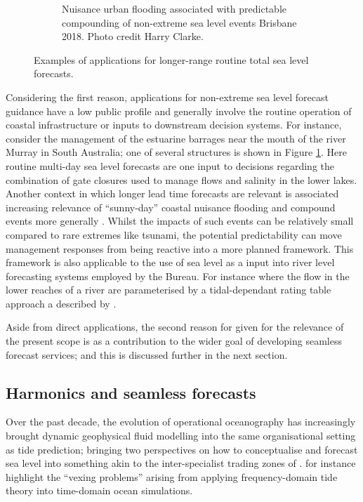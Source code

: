 \begin{figure}[!hbt]
\begin{subfigure}[t]{\figwidthHalf}
      \caption{Nuisance urban flooding associated with predictable compounding of non-extreme sea level events Brisbane 2018. Photo credit Harry Clarke.}
  \end{subfigure}
  \caption{Examples of applications for longer-range routine total sea level forecasts.} 
  \label{fig:applicationPhotos}
\end{figure}


Considering the first reason, applications for non-extreme sea level forecast guidance have a low public profile and generally involve the routine operation of coastal infrastructure or inputs to downstream decision systems.
For instance, consider the management of the estuarine barrages near the mouth of the river Murray in South Australia; one of several structures is shown in Figure \ref{fig:applicationPhotos}.  Here routine multi-day sea level forecasts are one input to decisions regarding the combination of gate closures used to manage flows and salinity in the lower lakes.  
Another context in which longer lead time forecasts are relevant is associated increasing relevance of ``sunny-day'' coastal nuisance flooding \citep{10.1007/s11069-021-04600-4} and compound events more generally \citep{McInnes:2016km}.   Whilst the impacts of such events can be relatively small compared to rare extremes like tsunami, the potential predictability can move  management responses from being reactive into a more planned framework.   
This framework is also applicable to the use of sea level as a input into river level forecasting systems employed by the Bureau.  For instance where the flow in the lower reaches of a river are parameterised by a tidal-dependant rating table approach a described by \citet{Leahy:2007tx}.


Aside from direct applications, the second reason for given for the relevance of the present scope is as a contribution to the wider goal of developing seamless forecast services; and this is discussed further in the next section. 

\subsection{Harmonics and seamless forecasts}
\label{sec:concrete}
Over the past decade, the evolution of operational oceanography has increasingly brought dynamic geophysical fluid modelling into the same organisational setting as tide prediction\citep{10.1080/1755876x.2019.1685834};  bringing two perspectives on how to conceptualise and forecast sea level into something akin to the inter-specialist trading zones of  \citet{Galison:1996uc}.  \citet{Jayne:2001tr} for instance highlight the ``vexing problems'' arising from applying frequency-domain tide theory into time-domain ocean simulations.



